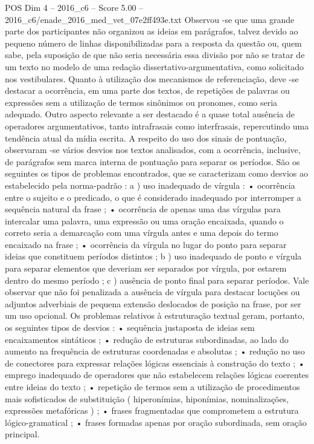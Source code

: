 \begin{textsample}{POS Dim 4 – 2016\_c6 – Score 5.00 – 2016\_c6/enade\_2016\_med\_vet\_07e2ff493e.txt}
Observou -se que uma grande parte dos participantes não organizou as ideias em parágrafos, talvez devido ao pequeno número de linhas disponibilizadas para a resposta da questão ou, quem sabe, pela suposição de que não seria necessária essa divisão por não se tratar de um texto no modelo de uma redação dissertativo-argumentativa, como solicitado nos vestibulares.
Quanto à utilização dos mecanismos de referenciação, deve -se destacar a ocorrência, em uma parte dos textos, de repetições de palavras ou expressões sem a utilização de termos sinônimos ou pronomes, como seria adequado.
Outro aspecto relevante a ser destacado é a quase total ausência de operadores argumentativos, tanto intrafrasais como interfrasais, repercutindo uma tendência atual da mídia escrita.
A respeito do uso dos sinais de pontuação, observaram -se vários desvios nos textos analisados, com a ocorrência, inclusive, de parágrafos sem marca interna de pontuação para separar os períodos.
São os seguintes os tipos de problemas encontrados, que se caracterizam como desvios ao estabelecido pela norma-padrão : a ) uso inadequado de vírgula : • ocorrência entre o sujeito e o predicado, o que é considerado inadequado por interromper a sequência natural da frase ; • ocorrência de apenas uma das vírgulas para intercalar uma palavra, uma expressão ou uma oração encaixada, quando o correto seria a demarcação com uma vírgula antes e uma depois do termo encaixado na frase ; • ocorrência da vírgula no lugar do ponto para separar ideias que constituem períodos distintos ; b ) uso inadequado de ponto e vírgula para separar elementos que deveriam ser separados por vírgula, por estarem dentro do mesmo período ; c ) ausência de ponto final para separar períodos.
Vale observar que não foi penalizada a ausência de vírgula para destacar locuções ou adjuntos adverbiais de pequena extensão deslocados de posição na frase, por ser um uso opcional.
Os problemas relativos à estruturação textual geram, portanto, os seguintes tipos de desvios : • sequência justaposta de ideias sem encaixamentos sintáticos ; • redução de estruturas subordinadas, ao lado do aumento na frequência de estruturas coordenadas e absolutas ; • redução no uso de conectores para expressar relações lógicas essenciais à construção do texto ; • emprego inadequado de operadores que não estabelecem relações lógicas coerentes entre ideias do texto ; • repetição de termos sem a utilização de procedimentos mais sofisticados de substituição ( hiperonímias, hiponímias, nominalizações, expressões metafóricas ) ; • frases fragmentadas que comprometem a estrutura lógico-gramatical ; • frases formadas apenas por oração subordinada, sem oração principal.

\end{textsample}
